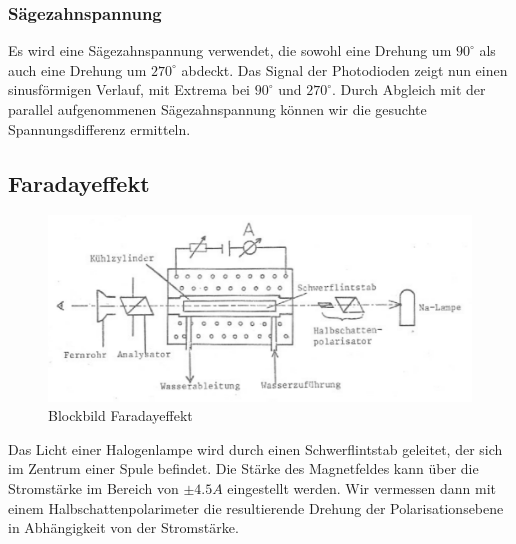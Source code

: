 \subsubsection{Sägezahnspannung}
Es wird eine Sägezahnspannung verwendet, die sowohl eine Drehung um $90^{\circ}$ als auch eine Drehung um $270^{\circ}$ abdeckt. Das Signal der Photodioden zeigt nun einen sinusförmigen Verlauf, mit Extrema bei $90^{\circ}$ und $270^{\circ}$. Durch Abgleich mit der parallel aufgenommenen Sägezahnspannung können wir die gesuchte Spannungsdifferenz ermitteln.
 
\subsection{Faradayeffekt}

\begin{figure}[H]
 \centering
 \includegraphics[width=0.9\linewidth]{Bilder/blockbild-faraday.png}
\caption{Blockbild Faradayeffekt}
\end{figure}

Das Licht einer Halogenlampe wird durch einen Schwerflintstab geleitet, der sich im Zentrum einer Spule befindet. Die Stärke des Magnetfeldes kann über die Stromstärke im Bereich von $\pm 4.5A$ eingestellt werden. Wir vermessen dann mit einem Halbschattenpolarimeter die resultierende Drehung der Polarisationsebene in Abhängigkeit von der Stromstärke.
